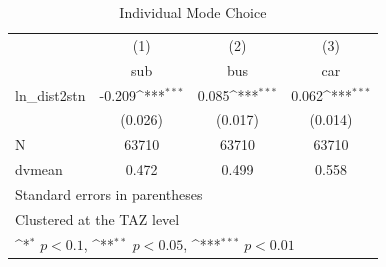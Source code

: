 \begin{table}[htbp]\centering
\def\sym#1{\ifmmode^{#1}\else\(^{#1}\)\fi}
\caption{Individual Mode Choice}
\begin{tabular}{l*{3}{c}}
\hline\hline
            &\multicolumn{1}{c}{(1)}&\multicolumn{1}{c}{(2)}&\multicolumn{1}{c}{(3)}\\
            &\multicolumn{1}{c}{sub}&\multicolumn{1}{c}{bus}&\multicolumn{1}{c}{car}\\
\hline
ln\_dist2stn & -0.209\sym{***}&  0.085\sym{***}&  0.062\sym{***}\\
            &(0.026)         &(0.017)         &(0.014)         \\
\hline
N           &  63710         &  63710         &  63710         \\
dvmean      &  0.472         &  0.499         &  0.558         \\
\hline\hline
\multicolumn{4}{l}{\footnotesize Standard errors in parentheses}\\
\multicolumn{4}{l}{\footnotesize Clustered at the TAZ level}\\
\multicolumn{4}{l}{\footnotesize \sym{*} \(p<0.1\), \sym{**} \(p<0.05\), \sym{***} \(p<0.01\)}\\
\end{tabular}
\end{table}
